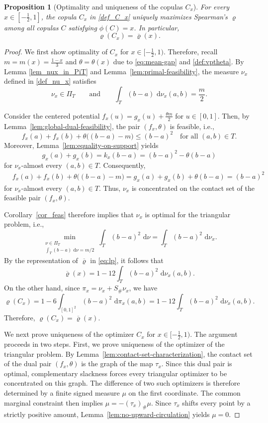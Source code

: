 \documentclass{article}
\newtheorem{proposition}[theorem]{Proposition}
\newcommand{\de}{\mathrm{\,d}}
\begin{document}
\begin{proposition}[Optimality and uniqueness of the copulas \(C_x\)]
\label{prop:rho-phi-Cx}
For every \(x\in[-\frac12,1]\), the copula \(C_x\) in \eqref{def_C_x} uniquely maximizes Spearman's \(\varrho\) among all copulas \(C\) satisfying \(\phi(C)=x\).
In particular,
\[
    \varrho(C_x)=\overline{\varrho}(x).
\]
\end{proposition}

\begin{proof}
We first show optimality of \(C_x\) for \(x\in[-\frac12,1)\).
Therefore, recall \(m=m(x) = \frac{1-x}{3}\) and \(\theta=\theta(x)\) due to \eqref{eq:mean-gap} and \eqref{def:vptheta}.
By Lemma \ref{lem_nux_in_PiT} and Lemma~\ref{lem:primal-feasibility}, the measure \(\nu_x\) defined in \eqref{def_nu_x} satisfies
\[
    \nu_x\in\Pi_T
    \qquad\text{and}\qquad
    \int_T(b-a)\,\de\nu_x(a,b)=\frac{m}{2}.
\]

Consider the centered potential \(f_x(u)=g_x(u)+\frac{\theta m}{2}\) for \(u\in[0,1]\).
Then, by Lemma~\ref{lem:global-dual-feasibility}, the pair \((f_x,\theta)\) is feasible, i.e.,
\[
    f_x(a)+f_x(b)
    +\theta\bigl((b-a)-m\bigr)
    \leq
    (b-a)^2 \quad \text{for all } (a,b)\in T.
\]
Moreover, Lemma~\ref{lem:equality-on-support} yields
\[
    g_x(a)+g_x(b)
    =
    k_x(b-a)
    =
    (b-a)^2-\theta(b-a)
\]
for \(\nu_x\)-almost every \((a,b)\in T\).
Consequently,
\begin{align*}
    &f_x(a)+f_x(b)
    +\theta\bigl((b-a)-m\bigr)
    =
    g_x(a)+g_x(b)+\theta(b-a)
    =
    (b-a)^2
\end{align*}
for \(\nu_x\)-almost every \((a,b)\in T\).
Thus, \(\nu_x\) is concentrated on the contact set of the feasible pair \((f_x,\theta)\).

Corollary~\ref{cor_feas} therefore implies that \(\nu_x\) is optimal for the triangular problem, i.e.,
\[
    \min_{\substack{\nu\in\Pi_T\\
    \int_T(b-a)\,\de\nu=m/2}}
    \int_T(b-a)^2\,\de\nu
    =
    \int_T(b-a)^2\,\de\nu_x.
\]
By the representation of \(\overline{\varrho}\) in \eqref{eq:lp}, it follows that
\[
    \overline{\varrho}(x)
    =
    1-12\int_T(b-a)^2\,\de\nu_x(a,b).
\]
On the other hand, since \(\pi_x=\nu_x+S_\#\nu_x\), we have
\[
    \varrho(C_x)
    =
    1-6\int_{[0,1]^2}(b-a)^2\,\de\pi_x(a,b)
    =
    1-12\int_T(b-a)^2\,\de\nu_x(a,b).
\]
Therefore, \(\varrho(C_x)=\overline{\varrho}(x)\).


We next prove uniqueness of the optimizer \(C_x\) for \(x\in[-\frac12,1)\).
The argument proceeds in two steps.
First, we prove uniqueness of the optimizer of the triangular problem.
By Lemma~\ref{lem:contact-set-characterization}, the contact set of the dual pair \((f_x,\theta)\) is the graph of the map \(\tau_x\).
Since this dual pair is optimal, complementary slackness forces every triangular optimizer to be concentrated on this graph.
The difference of two such optimizers is therefore determined by a finite signed measure \(\mu\) on the first coordinate.
The common marginal constraint then implies \(\mu=-(\tau_x)_\#\mu.\) Since \(\tau_x\) shifts every point by a strictly positive amount, Lemma~\ref{lem:no-upward-circulation} yields \(\mu=0\).


\end{proof}
\end{document}
